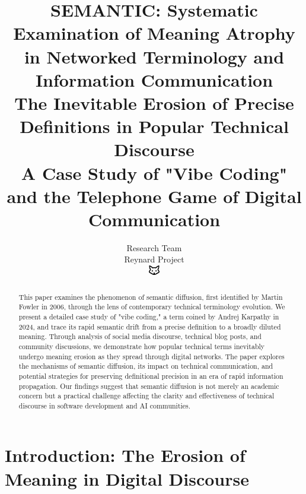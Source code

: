 \documentclass[11pt]{article}
\begin{document}
\title{\textbf{SEMANTIC: Systematic Examination of Meaning Atrophy in Networked Terminology and Information Communication} \\
\Large{The Inevitable Erosion of Precise Definitions in Popular Technical Discourse} \\
\large{A Case Study of "Vibe Coding" and the Telephone Game of Digital Communication}}

\author{Research Team\\
Reynard Project\\
\includegraphics[width=0.5cm]{favicon.pdf}}

\maketitle

\begin{abstract}
This paper examines the phenomenon of semantic diffusion, first identified by Martin Fowler in 2006, through the lens of contemporary technical terminology evolution. We present a detailed case study of "vibe coding," a term coined by Andrej Karpathy in 2024, and trace its rapid semantic drift from a precise definition to a broadly diluted meaning. Through analysis of social media discourse, technical blog posts, and community discussions, we demonstrate how popular technical terms inevitably undergo meaning erosion as they spread through digital networks. The paper explores the mechanisms of semantic diffusion, its impact on technical communication, and potential strategies for preserving definitional precision in an era of rapid information propagation. Our findings suggest that semantic diffusion is not merely an academic concern but a practical challenge affecting the clarity and effectiveness of technical discourse in software development and AI communities.
\end{abstract}

\tableofcontents
\newpage

\section{Introduction: The Erosion of Meaning in Digital Discourse}
\end{document}
